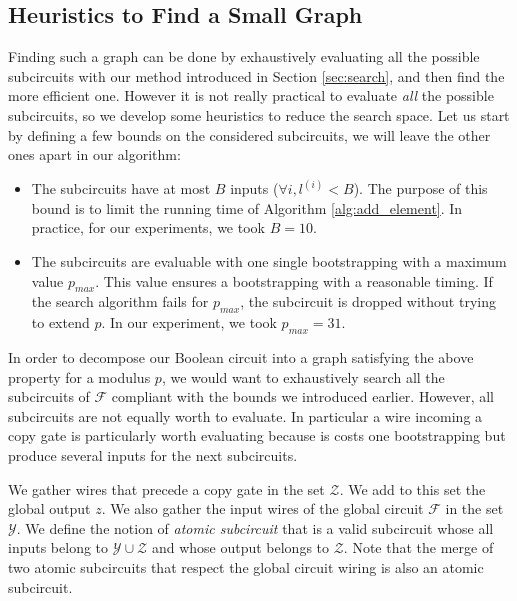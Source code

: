 \subsection{Heuristics to Find a Small Graph}
\label{sec:heuristics_graph}

Finding such a graph can be done by exhaustively evaluating all the possible subcircuits with our method introduced in Section \ref{sec:search}, and then find the more efficient one. However it is not really practical to evaluate \emph{all} the possible subcircuits, so we develop some heuristics to reduce the search space. Let us start by defining a few bounds on the considered subcircuits, we will leave the other ones apart in our algorithm:

\begin{itemize}
    \item The subcircuits have at most $B$ inputs ($\forall i, l^{(i)} < B$). The purpose of this bound is to limit the running time of Algorithm \ref{alg:add_element}. In practice, for our experiments, we took $B = 10$.
    \item The subcircuits are evaluable with one single bootstrapping with a maximum value $p_{max}$. This value ensures a bootstrapping with a reasonable timing. If the search algorithm fails for $p_{max}$, the subcircuit is dropped without trying to extend $p$. In our experiment, we took $p_{max}=31$.
\end{itemize}


In order to decompose our Boolean circuit into a graph satisfying the above property for a modulus $p$, we would want to exhaustively search all the subcircuits of $\mathcal{F}$ compliant with the bounds we introduced earlier. However, all subcircuits are not equally worth to evaluate. In particular a wire incoming a copy gate is particularly worth evaluating because is costs one bootstrapping but produce several inputs for the next subcircuits. 

We gather wires that precede a copy gate in the set $\mathcal{Z}$. We add to this set the global output $z$. We also gather the input wires of the global circuit $\mathcal{F}$ in the set $\mathcal{Y}$. We define the notion of \textit{atomic subcircuit} that is a valid subcircuit whose all inputs belong to $\mathcal{Y} \cup \mathcal{Z}$ and whose output belongs to $\mathcal{Z}$. Note that the merge of two atomic subcircuits that respect the global circuit wiring is also an atomic subcircuit.

\medskip


